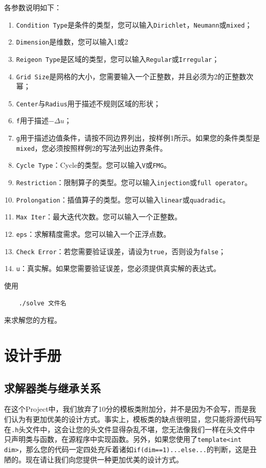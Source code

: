 \documentclass[lang=cn,10pt]{elegantbook}
\begin{document}
各参数说明如下：

\begin{enumerate}[(1)]
\item \verb|Condition Type|是条件的类型，您可以输入\verb|Dirichlet|，\verb|Neumann|或\verb|mixed|；
\item \verb|Dimension|是维数，您可以输入1或2
\item \verb|Reigeon Type|是区域的类型，您可以输入\verb|Regular|或\verb|Irregular|；
\item \verb|Grid Size|是网格的大小，您需要输入一个正整数，并且必须为2的正整数次幂；
\item \verb|Center|与\verb|Radius|用于描述不规则区域的形状；
\item \verb|f|用于描述$-\Delta u$；
\item \verb|g|用于描述边值条件，请按不同边界列出，按样例1所示。如果您的条件类型是\verb|mixed|，您必须按照样例2的写法列出边界条件。
\item \verb|Cycle Type|：Cycle的类型。您可以输入\verb|V|或\verb|FMG|。
\item \verb|Restriction|：限制算子的类型。您可以输入\verb|injection|或\verb|full operator|。
\item \verb|Prolongation|：插值算子的类型。您可以输入\verb|linear|或\verb|quadradic|。
\item \verb|Max Iter|：最大迭代次数。您可以输入一个正整数。
\item \verb|eps|：求解精度需求。您可以输入一个正浮点数。
\item \verb|Check Error|：若您需要验证误差，请设为\verb|true|，否则设为\verb|false|；
\item \verb|u|：真实解。如果您需要验证误差，您必须提供真实解的表达式。
\end{enumerate}

使用
\begin{lstlisting}
    ./solve 文件名
\end{lstlisting}

来求解您的方程。

\newpage

\chapter{设计手册}

\section{求解器类与继承关系}

在这个Project中，我们放弃了10分的模板类附加分，并不是因为不会写，而是我们认为有更加优美的设计方式。事实上，模板类的缺点很明显，您只能将源代码写在\verb|.h|头文件中，这会让您的头文件显得杂乱不堪，您无法像我们一样在头文件中只声明类与函数，在源程序中实现函数。另外，如果您使用了\verb|template<int dim>|，那么您的代码一定四处充斥着诸如\verb|if(dim==1)...else...|的判断，这是丑陋的。现在请让我们向您提供一种更加优美的设计方式。
\end{document}
